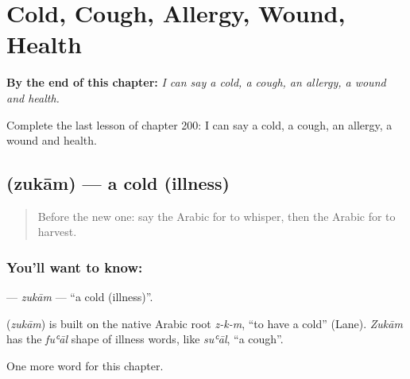 
\chapter{Cold, Cough, Allergy, Wound, Health}
\label{ch:ar-cold-cough-allergy-wound-health}

\begin{chapteropening}
\textbf{By the end of this chapter:} \emph{I can say a cold, a cough, an allergy, a wound and health.}

Complete the last lesson of chapter 200: I can say a cold, a cough, an allergy, a wound and health.
\end{chapteropening}

\section[\texorpdfstring{\ar{زكام} (zukām)}{زكام (zukām)}]{ (zukām) — a cold (illness)}

\label{lesson:AR-C200-zukam}



\begin{quote}
Before the new one: say the Arabic for to whisper, then the Arabic for to harvest.
\end{quote}

\subsection*{You'll want to know: }
\textbf{} — \emph{zukām} — \textquotedblleft{}a cold (illness)\textquotedblright{}.

\begin{cousinweb}
\textbf{} (\emph{zukām}) is built on the native Arabic root \emph{z-k-m}, \textquotedblleft{}to have a cold\textquotedblright{} (Lane). \emph{Zukām} has the \emph{fuʿāl} shape of illness words, like \emph{suʿāl}, \textquotedblleft{}a cough\textquotedblright{}.
\end{cousinweb}

\begin{grammarlens}[title={What you've built}]
One more word for this chapter.
\end{grammarlens}

